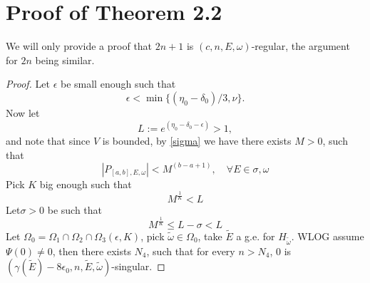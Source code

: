 \section{Proof of Theorem 2.2}
We will only provide a proof that $2n+1$ is $(c, n, E,\omega)$-regular, the argument for $2n$ being similar.
\begin{proof}
Let $\epsilon$ be small enough such that
  \begin{equation}\label{epsilon1}
    \epsilon<\min\{(\eta_0-\delta_0)/3,\nu\}.
  \end{equation}
Now let
  \[L:=e^{(\eta_0-\delta_0-\epsilon)}>1,\]
and note that since $V$ is bounded, by \ref{sigma} we have there exists $ M>0$, such that
\[
|P_{[a,b],E,\omega}|<M^{(b-a+1)},\quad \forall E\in\sigma,\omega
\]
Pick $K$ big enough such that
  \[M^{\frac{1}{K}}<L\]
Let$ \sigma>0$ be such that
\begin{equation}\label{K}
M^{\frac{1}{K}}\leq L-\sigma<L
\end{equation}
Let $\Omega_0=\Omega_1\cap\Omega_2\cap\Omega_3(\epsilon,K)$, pick $\tilde{\omega}\in\Omega_0$, take $\tilde{E}$ a g.e. for $H_{\tilde{\omega}}$.
WLOG assume $\Psi(0)\neq 0$, then there exists $ N_4$, such that for every $ n>N_4$, 0 is $(\gamma(\tilde{E})-8\epsilon_0,n,\tilde{E},\tilde{\omega})$-singular.



\end{proof}
